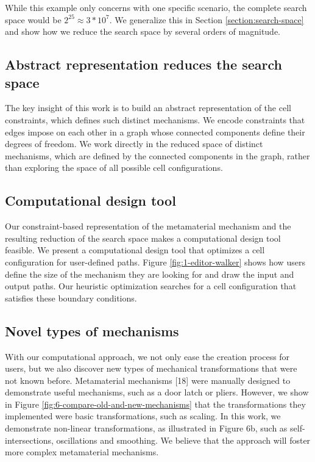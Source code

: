 While this example only concerns with one specific scenario, the complete search space would be $2^{25} \approx 3*{10}^7$. We generalize this in Section \ref{section:search-space} and show how we reduce the search space by several orders of magnitude.


\subsection{Abstract representation reduces the search space}

The key insight of this work is to build an abstract representation of the cell constraints, which defines such distinct mechanisms. We encode constraints that edges impose on each other in a graph whose connected components define their degrees of freedom. We work directly in the reduced space of distinct mechanisms, which are defined by the connected components in the graph, rather than exploring the space of all possible cell configurations. 


\subsection{Computational design tool}

Our constraint-based representation of the metamaterial mechanism and the resulting reduction of the search space makes a computational design tool feasible. We present a computational design tool that optimizes a cell configuration for user-defined paths. Figure \ref{fig:1-editor-walker} shows how users define the size of the mechanism they are looking for and draw the input and output paths. Our heuristic optimization searches for a cell configuration that satisfies these boundary conditions. 


\subsection{Novel types of mechanisms}

With our computational approach, we not only ease the creation process for users, but we also discover new types of mechanical transformations that were not known before. Metamaterial mechanisms [18] were manually designed to demonstrate useful mechanisms, such as a door latch or pliers. However, we show in Figure \ref{fig:6-compare-old-and-new-mechanisms} that the transformations they implemented were basic transformations, such as scaling. In this work, we demonstrate non-linear transformations, as illustrated in Figure 6b, such as self-intersections, oscillations and smoothing. We believe that the approach will foster more complex metamaterial mechanisms. 

